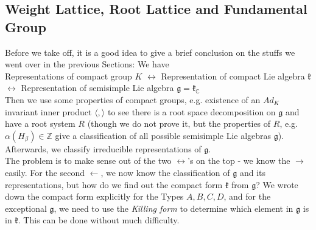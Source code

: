 \documentclass[11pt]{article}
\newcommand{\bb}[1]{\mathbb{#1}}
\newcommand{\mf}[1]{\mathfrak{#1}}
\begin{document}
\subsection{Weight Lattice, Root Lattice and Fundamental Group}
Before we take off, it is a good idea to give a brief conclusion on the stuffs we went over in the previous Sections: We have\\

\noindent Representations of compact group $K$ $\longleftrightarrow$ Representation of compact Lie algebra $\mf{k}$ $\longleftrightarrow$ Representation of semisimple Lie algebra $\mf{g} = \mf{k}_{\bb{C}}$\\

\noindent Then we use some properties of compact groups, e.g. existence of an $Ad_K$ invariant inner product $\langle, \rangle$ to see there is a root space decomposition on $\mf{g}$ and have a root system $R$ (though we do not prove it, but the properties of $R$, e.g. $\alpha(H_{\beta}) \in \bb{Z}$ give a classification of all possible semisimple Lie algebras $\mf{g}$). Afterwards, we classify irreducible representations of $\mf{g}$.\\

\noindent The problem is to make sense out of the two $\longleftrightarrow$'s on the top - we know the $\rightarrow$ easily. For the second $\leftarrow$, we now know the classification of $\mf{g}$ and its representations, but how do we find out the compact form $\mf{k}$ from $\mf{g}$? We wrote down the compact form explicitly for the Types $A, B, C, D$, and for the exceptional $\mf{g}$, we need to use the \textit{Killing form} to determine which element in $\mf{g}$ is in $\mf{k}$. This can be done without much difficulty.\\
\end{document}
